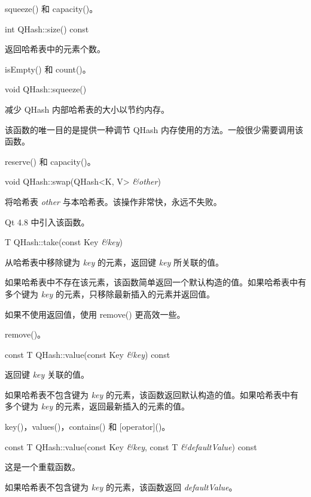 \begin{seeAlso}
squeeze() 和 capacity()。
\end{seeAlso}

int QHash::size() const

返回哈希表中的元素个数。

\begin{seeAlso}
isEmpty() 和 count()。
\end{seeAlso}

void QHash::squeeze()

减少 QHash 内部哈希表的大小以节约内存。

该函数的唯一目的是提供一种调节 QHash 内存使用的方法。一般很少需要调用该函数。

\begin{seeAlso}
reserve() 和 capacity()。
\end{seeAlso}

void QHash::swap(QHash<K, V> \emph{\&other})

将哈希表 \emph{other} 与本哈希表。该操作非常快，永远不失败。

Qt 4.8 中引入该函数。

T QHash::take(const Key \emph{\&key})

从哈希表中移除键为 \emph{key} 的元素，返回键 \emph{key} 所关联的值。

如果哈希表中不存在该元素，该函数简单返回一个默认构造的值。如果哈希表中有多个键为 \emph{key} 的元素，只移除最新插入的元素并返回值。

如果不使用返回值，使用 remove() 更高效一些。

\begin{seeAlso}
remove()。
\end{seeAlso}


const T QHash::value(const Key \emph{\&key}) const

返回键 \emph{key} 关联的值。

如果哈希表不包含键为 \emph{key} 的元素，该函数返回默认构造的值。如果哈希表中有多个键为 \emph{key} 的元素，返回最新插入的元素的值。

\begin{seeAlso}
key()，values()，contains() 和 [operator]()。
\end{seeAlso}

const T QHash::value(const Key \emph{\&key}, const T \emph{\&defaultValue}) const

这是一个重载函数。

如果哈希表不包含键为 \emph{key} 的元素，该函数返回 \emph{defaultValue}。


